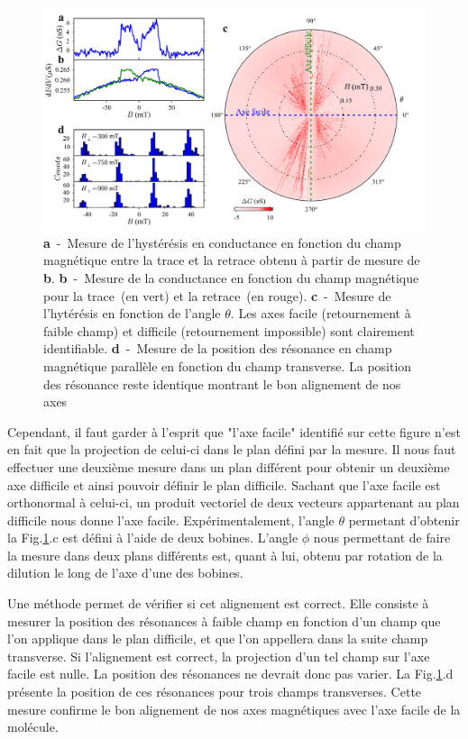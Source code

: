 \begin{figure}
\includegraphics[scale=0.45]{Resultats/Alignement/Alignement.pdf} 
\caption{\textbf{a}~-~Mesure de l’hystérésis en conductance en fonction du champ magnétique entre la trace et la retrace obtenu à partir de mesure de \textbf{b}. \textbf{b}~-~Mesure de la conductance en fonction du champ magnétique pour la trace~(en vert) et la retrace~(en rouge). \textbf{c}~-~Mesure de l'hytérésis en fonction de l'angle $\theta$. Les axes facile (retournement à faible champ) et difficile (retournement impossible) sont clairement identifiable. \textbf{d}~-~Mesure de la position des résonance en champ magnétique parallèle en fonction du champ transverse. La position des résonance reste identique montrant le bon alignement de nos axes}
\label{alignement}
\end{figure}

Cependant, il faut garder à l'esprit que "l'axe facile" identifié sur cette figure n'est en fait que la projection de celui-ci dans le plan défini par la mesure. Il nous faut effectuer une deuxième mesure dans un plan différent pour obtenir un deuxième axe difficile et ainsi pouvoir définir le plan difficile. Sachant que l'axe facile est orthonormal à celui-ci, un produit vectoriel de deux vecteurs appartenant au plan difficile nous donne l'axe facile. Expérimentalement, l'angle $\theta$ permetant d'obtenir la Fig.\ref{alignement}.c est défini à l'aide de deux bobines. L'angle $\phi$ nous permettant de faire la mesure dans deux plans différents est, quant à lui, obtenu par rotation de la dilution le long de l'axe d'une des bobines.


Une méthode permet de vérifier si cet alignement est correct.  Elle consiste à mesurer la position des résonances à faible champ en fonction d'un champ que l'on applique dans le plan difficile, et que l'on appellera dans la suite champ transverse. Si l'alignement est correct, la projection d'un tel champ sur l'axe facile est nulle. La position des résonances ne devrait donc pas varier. La Fig.\ref{alignement}.d présente la position de ces résonances pour trois champs transverses. Cette mesure confirme le bon alignement de nos axes magnétiques avec l'axe facile de la molécule.

